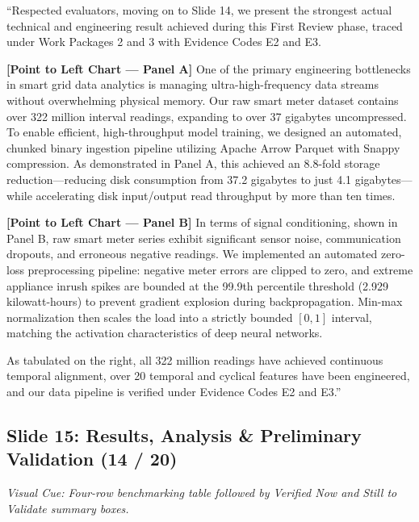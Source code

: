 \documentclass[11pt,a4paper]{article}
\begin{document}
\begin{scriptbox}
``Respected evaluators, moving on to Slide 14, we present the strongest actual technical and engineering result achieved during this First Review phase, traced under Work Packages 2 and 3 with Evidence Codes E2 and E3.

\textbf{[Point to Left Chart --- Panel A]} One of the primary engineering bottlenecks in smart grid data analytics is managing ultra-high-frequency data streams without overwhelming physical memory. Our raw smart meter dataset contains over 322 million interval readings, expanding to over 37 gigabytes uncompressed. To enable efficient, high-throughput model training, we designed an automated, chunked binary ingestion pipeline utilizing Apache Arrow Parquet with Snappy compression. As demonstrated in Panel A, this achieved an 8.8-fold storage reduction---reducing disk consumption from 37.2 gigabytes to just 4.1 gigabytes---while accelerating disk input/output read throughput by more than ten times.

\textbf{[Point to Left Chart --- Panel B]} In terms of signal conditioning, shown in Panel B, raw smart meter series exhibit significant sensor noise, communication dropouts, and erroneous negative readings. We implemented an automated zero-loss preprocessing pipeline: negative meter errors are clipped to zero, and extreme appliance inrush spikes are bounded at the 99.9th percentile threshold (2.929 kilowatt-hours) to prevent gradient explosion during backpropagation. Min-max normalization then scales the load into a strictly bounded $[0, 1]$ interval, matching the activation characteristics of deep neural networks.

As tabulated on the right, all 322 million readings have achieved continuous temporal alignment, over 20 temporal and cyclical features have been engineered, and our data pipeline is verified under Evidence Codes E2 and E3.''
\end{scriptbox}

\subsection{Slide 15: Results, Analysis \& Preliminary Validation (14 / 20)}
\textit{Visual Cue: Four-row benchmarking table followed by Verified Now and Still to Validate summary boxes.}
\end{document}
